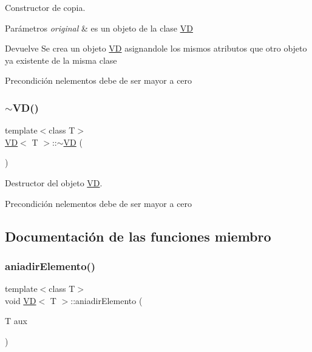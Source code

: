Constructor de copia. 


\begin{DoxyParams}{Parámetros}
{\em original} & es un objeto de la clase \hyperlink{classVD}{VD} \\
\hline
\end{DoxyParams}
\begin{DoxyReturn}{Devuelve}
Se crea un objeto \hyperlink{classVD}{VD} asignandole los mismos atributos que otro objeto ya existente de la misma clase 
\end{DoxyReturn}
\begin{DoxyPrecond}{Precondición}
nelementos debe de ser mayor a cero 
\end{DoxyPrecond}
\mbox{\label{classVD_a0533f99aa2fee31fde63edd6c4b8bb2d}} 
\subsubsection{\texorpdfstring{$\sim$\+V\+D()}{~VD()}}
{\footnotesize\ttfamily template$<$class T$>$ \\
\hyperlink{classVD}{VD}$<$ T $>$\+::$\sim$\hyperlink{classVD}{VD} (\begin{DoxyParamCaption}{ }\end{DoxyParamCaption})\hspace{0.3cm}{\ttfamily [inline]}}



Destructor del objeto \hyperlink{classVD}{VD}. 

\begin{DoxyPrecond}{Precondición}
nelementos debe de ser mayor a cero 
\end{DoxyPrecond}


\subsection{Documentación de las funciones miembro}
\mbox{\label{classVD_a4a3d631ec9c48db64746377745141fef}} 
\subsubsection{\texorpdfstring{aniadir\+Elemento()}{aniadirElemento()}}
{\footnotesize\ttfamily template$<$class T$>$ \\
void \hyperlink{classVD}{VD}$<$ T $>$\+::aniadir\+Elemento (\begin{DoxyParamCaption}\item[{T}]{aux }\end{DoxyParamCaption})\hspace{0.3cm}{\ttfamily [inline]}}



